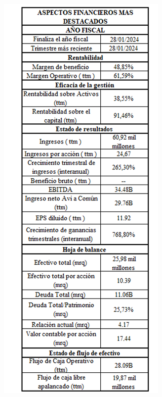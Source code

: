 \documentclass[conference]{IEEEtran}
\begin{document}
\begin{figure}[H]
	\begin{center}
		\includegraphics[width=\linewidth]{./Images/Anexo2.png}
		\caption{}
	\end{center}
\end{figure}
\end{document}
